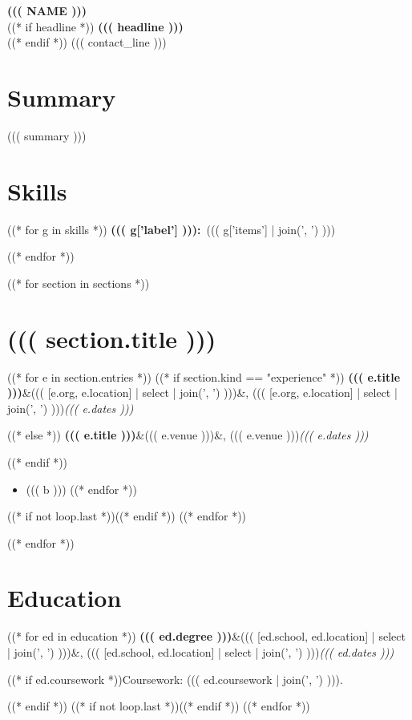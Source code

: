 \documentclass[10pt,((( paper )))]{article}
\newcommand{\entry}[3]{\textbf{#1}\ifx&#2&\else, #2\fi\hfill\textit{#3}\par}
\begin{document}
\begin{center}
  {\Large\bfseries\lsstyle\MakeUppercase{((( name )))}}\\[3pt]
((* if headline *))
  {\bfseries ((( headline )))}\\[2pt]
((* endif *))
  {\small ((( contact_line )))}
\end{center}
\vspace{-6pt}

\section{Summary}
((( summary )))

\section{Skills}
((* for g in skills *))
\textbf{((( g['label'] ))):}\ ((( g['items'] | join(', ') )))\par
((* endfor *))

((* for section in sections *))
\section{((( section.title )))}
((* for e in section.entries *))
((* if section.kind == "experience" *))
\entry{((( e.title )))}{((( [e.org, e.location] | select | join(', ') )))}{((( e.dates )))}
((* else *))
\entry{((( e.title )))}{((( e.venue )))}{((( e.dates )))}
((* endif *))
\begin{itemize}
((* for b in e.bullets *))
  \item ((( b )))
((* endfor *))
\end{itemize}
((* if not loop.last *))\vspace{2pt}((* endif *))
((* endfor *))

((* endfor *))
\section{Education}
((* for ed in education *))
\entry{((( ed.degree )))}{((( [ed.school, ed.location] | select | join(', ') )))}{((( ed.dates )))}
((* if ed.coursework *))Coursework: ((( ed.coursework | join(', ') ))).\par((* endif *))
((* if not loop.last *))\vspace{3pt}((* endif *))
((* endfor *))
\end{document}
